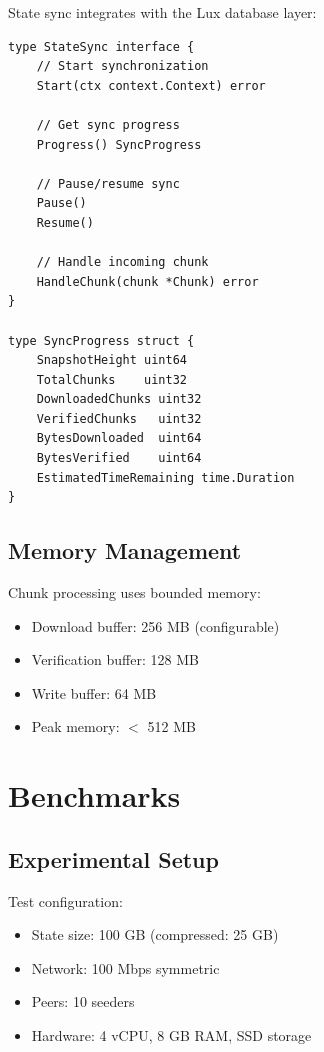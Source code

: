 \documentclass[11pt,a4paper]{article}
\begin{document}
State sync integrates with the Lux database layer:

\begin{lstlisting}
type StateSync interface {
    // Start synchronization
    Start(ctx context.Context) error

    // Get sync progress
    Progress() SyncProgress

    // Pause/resume sync
    Pause()
    Resume()

    // Handle incoming chunk
    HandleChunk(chunk *Chunk) error
}

type SyncProgress struct {
    SnapshotHeight uint64
    TotalChunks    uint32
    DownloadedChunks uint32
    VerifiedChunks   uint32
    BytesDownloaded  uint64
    BytesVerified    uint64
    EstimatedTimeRemaining time.Duration
}
\end{lstlisting}

\subsection{Memory Management}

Chunk processing uses bounded memory:

\begin{itemize}
    \item Download buffer: 256 MB (configurable)
    \item Verification buffer: 128 MB
    \item Write buffer: 64 MB
    \item Peak memory: $<$ 512 MB
\end{itemize}

\section{Benchmarks}

\subsection{Experimental Setup}

Test configuration:
\begin{itemize}
    \item State size: 100 GB (compressed: 25 GB)
    \item Network: 100 Mbps symmetric
    \item Peers: 10 seeders
    \item Hardware: 4 vCPU, 8 GB RAM, SSD storage
\end{itemize}
\end{document}
